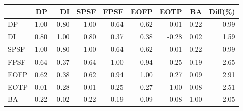 \begin{tabular}{l|rrrrrrr|r}
\toprule
 & DP & DI & SPSF & FPSF & EOFP & EOTP & BA & Diff(\%)  \\
\midrule
DP & 1.00 & 0.80 & 1.00 & 0.64 & 0.62 & 0.01 & 0.22 & 0.99  \\
DI & 0.80 & 1.00 & 0.80 & 0.37 & 0.38 & -0.28 & 0.02 & 1.59  \\
SPSF & 1.00 & 0.80 & 1.00 & 0.64 & 0.62 & 0.01 & 0.22 & 0.99  \\
FPSF & 0.64 & 0.37 & 0.64 & 1.00 & 0.94 & 0.25 & 0.19 & 2.65  \\
EOFP & 0.62 & 0.38 & 0.62 & 0.94 & 1.00 & 0.27 & 0.09 & 2.91  \\
EOTP & 0.01 & -0.28 & 0.01 & 0.25 & 0.27 & 1.00 & 0.08 & 2.51  \\
BA & 0.22 & 0.02 & 0.22 & 0.19 & 0.09 & 0.08 & 1.00 & 2.05  \\
\bottomrule
\end{tabular}

